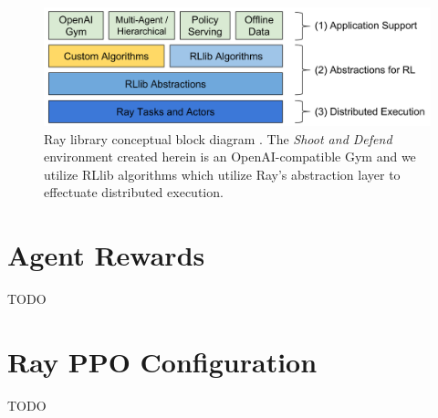 \documentclass{article}
\begin{document}
\begin{figure}
  \includegraphics[width=\linewidth]{imgs/ray_blockdiagram}
  \caption{Ray library conceptual block diagram \cite{ray_ppo}. The \textit{Shoot and Defend} environment created herein is an OpenAI-compatible Gym and we utilize RLlib algorithms which utilize Ray's abstraction layer to effectuate distributed execution.}
  \label{fig:ray_blockdiagram}
\end{figure}

\newpage
\appendix
\section{Agent Rewards}\label{app:rewards}
TODO 

\section{Ray PPO Configuration} \label{app:ray_config}
TODO


\newpage


\end{document}
